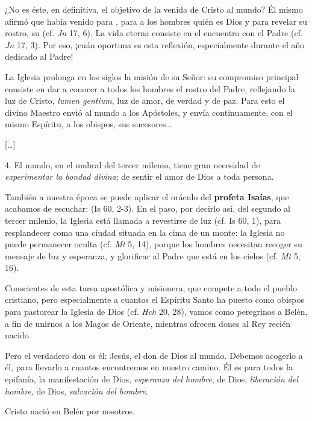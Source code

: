 \begin{body}
\begin{body}
¿No es éste, en definitiva, el objetivo de la venida de Cristo al mundo? Él mismo afirmó que había venido para , para  a los hombres quién es Dios y para revelar su rostro, su  (cf. \emph{Jn} 17, 6). La vida eterna consiste en el encuentro con el Padre (cf. \emph{Jn} 17, 3). Por eso, ¡cuán oportuna es esta reflexión, especialmente durante el año dedicado al Padre!

La Iglesia prolonga en los siglos la misión de su Señor: su compromiso principal consiste en dar a conocer a todos los hombres el rostro del Padre, reflejando la luz de Cristo, \emph{lumen gentium}, luz de amor, de verdad y de paz. Para esto el divino Maestro envió al mundo a los Apóstoles, y envía continuamente, con el mismo Espíritu, a los obispos, sus sucesores\ldots{}

{[}\ldots{}{]}

4. El mundo, en el umbral del tercer milenio, tiene gran necesidad de \emph{experimentar la bondad divina}; de sentir el amor de Dios a toda persona.

También a nuestra época se puede aplicar el oráculo del \textbf{profeta Isaías}, que acabamos de escuchar:  (Is 60, 2-3). En el paso, por decirlo así, del segundo al tercer milenio, la Iglesia está llamada a revestirse de luz (cf. Is 60, 1), para resplandecer como una ciudad situada en la cima de un monte: la Iglesia no puede permanecer oculta (cf. \emph{Mt} 5, 14), porque los hombres necesitan recoger su mensaje de luz y esperanza, y glorificar al Padre que está en los cielos (cf. \emph{Mt} 5, 16).

Conscientes de esta tarea apostólica y misionera, que compete a todo el pueblo cristiano, pero especialmente a cuantos el Espíritu Santo ha puesto como obispos para pastorear la Iglesia de Dios (cf. \emph{Hch} 20, 28), vamos como peregrinos a Belén, a fin de unirnos a los Magos de Oriente, mientras ofrecen dones al Rey recién nacido.

Pero el verdadero don es él: Jesús, el don de Dios al mundo. Debemos acogerlo a él, para llevarlo a cuantos encontremos en nuestro camino. Él es para todos la epifanía, la manifestación de Dios, \emph{esperanza del hombre}, de Dios, \emph{liberación del hombre}, de Dios, \emph{salvación del hombre}.

Cristo nació en Belén por nosotros.


\end{body}
\end{body}
